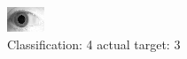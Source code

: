 \begin{figure}[h!]
\begin{center}
\includegraphics[width=0.60\columnwidth]{figures/ID1918_class_4_target_3.png}
\end{center}
\caption{ Classification: 4 actual target: 3}
\label{fig:ID1918_class_4_target_3}
\end{figure}
